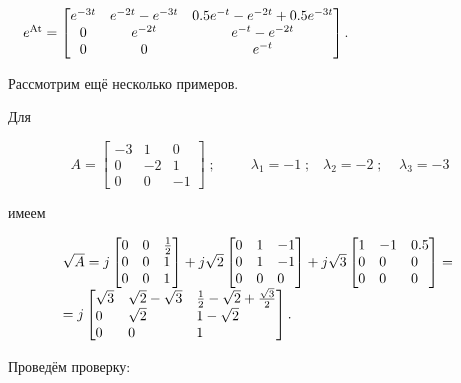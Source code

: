 \documentclass[a4paper]{article}
\newcommand\normalsubformula[1]{\text{\mathversion{normal}$#1$}}
\begin{document}
{\begin{russian}\sffamily
\ \ 
$e^{\normalsubformula{\text{At}}}=\left[\begin{matrix}e^{-3t}&e^{-2t}-e^{-3t}&0.5e^{-t}-e^{-2t}+0.5e^{-3t}\\0&e^{-2t}&e^{-t}-e^{-2t}\\0&0&e^{-t}\end{matrix}\right]$.
\end{russian}}

{\begin{russian}\sffamily
Рассмотрим ещё несколько примеров.
\end{russian}}

{\begin{russian}\sffamily
Для
\end{russian}}

\begin{equation*}
A=\left[\begin{matrix}-3&1&0\\0&-2&1\\0&0&-1\end{matrix}\right]\;;\;\;\;\;\;\;\;\;\;λ_1=-1\;;\;\;\;λ_2=-2\;;\;\;\;\;λ_3=-3
\end{equation*}
{\begin{russian}\sffamily
имеем
\end{russian}}

\begin{equation*}
\begin{matrix}\sqrt A=j\left[\begin{matrix}0\hfill\null &0\hfill\null &\frac 1 2\hfill\null \\0\hfill\null &0\hfill\null
&1\hfill\null \\0\hfill\null &0\hfill\null &1\hfill\null \end{matrix}\right]+j\sqrt 2\left[\begin{matrix}0\hfill\null
&1\hfill\null &-1\hfill\null \\0\hfill\null &1\hfill\null &-1\hfill\null \\0\hfill\null &0\hfill\null &0\hfill\null
\end{matrix}\right]+j\sqrt 3\left[\begin{matrix}1\hfill\null &-1\hfill\null &0.5\hfill\null \\0\hfill\null
&0\hfill\null &0\hfill\null \\0\hfill\null &0\hfill\null &0\hfill\null \end{matrix}\right]=\hfill\null
\\=j\left[\begin{matrix}\sqrt 3\hfill\null &\sqrt 2-\sqrt 3\hfill\null &\frac 1 2-\sqrt 2+\frac{\sqrt 3} 2\hfill\null
\\0\hfill\null &\sqrt 2\hfill\null &1-\sqrt 2\hfill\null \\0\hfill\null &0\hfill\null &1\hfill\null
\end{matrix}\right].\hfill\null \end{matrix}\hfill 
\end{equation*}
{\begin{russian}\sffamily
Проведём проверку:
\end{russian}}
\end{document}

